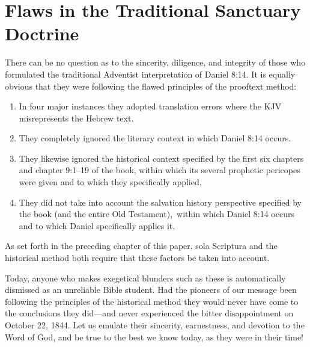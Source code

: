 \chapter{Flaws in the Traditional Sanctuary Doctrine}
\label{ch:flaws}

There can be no question as to the sincerity, diligence, and integrity of
those who formulated the traditional Adventist interpretation of
Daniel 8:14. It is equally obvious that they were following the flawed
principles of the prooftext method:
\begin{enumerate}
	\item In four major instances they adopted
translation errors where the KJV misrepresents the Hebrew text. 
	\item They
completely ignored the literary context in which Daniel 8:14 occurs.
	\item They likewise ignored the historical context specified by the first six
chapters and chapter 9:1--19 of the book, within which its several prophetic
pericopes were given and to which they specifically applied.
	\item They did not take into account the salvation history perspective 
specified by the 
        book (and the entire Old Testament),\sidenote[][-2cm]{\noteXXXVtext}~within which Daniel 8:14 occurs and
to which Daniel specifically applies it.
\end{enumerate}
As set forth in the preceding
chapter of this paper, sola Scriptura and the historical method both require
that these factors be taken into account.

Today, anyone who makes exegetical blunders such as these is automatically
dismissed as an unreliable Bible student. Had the pioneers of our message
been following the principles of the historical method they would never have
come to the conclusions they did---and never experienced the bitter
disappointment on October 22, 1844. Let us emulate their sincerity,
earnestness, and devotion to the Word of God, and be true to the best we
know today, as they were in their time!

